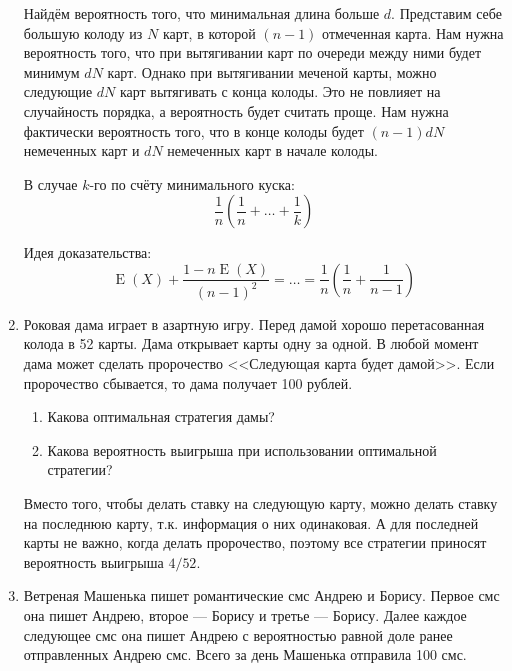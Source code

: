 \documentclass[nobib]{tufte-handout}
\DeclareMathOperator{\E}{E}
\begin{document}
\begin{enumerate}
\begin{solution}
Найдём вероятность того, что минимальная длина больше $d$. Представим себе большую колоду из $N$ карт, в которой $(n-1)$ отмеченная карта. Нам нужна вероятность того, что при вытягивании карт по очереди между ними будет минимум $dN$ карт. Однако при вытягивании меченой карты, можно следующие $dN$ карт вытягивать с конца колоды. Это не повлияет на случайность порядка, а вероятность будет считать проще. Нам нужна фактически вероятность того, что в конце колоды будет $(n-1)dN$ немеченных карт и $dN$ немеченных карт в начале колоды.


В случае $k$-го по счёту минимального куска:
\[
\frac{1}{n}\left( \frac{1}{n} + \ldots + \frac{1}{k}\right)
\]

Идея доказательства:
\[
\E(X) + \frac{1-n\E(X)}{(n-1)^2}=\ldots=\frac{1}{n}\left( \frac{1}{n} + \frac{1}{n-1}\right)
\]
\end{solution}


\item  Роковая дама играет в азартную игру. Перед дамой хорошо перетасованная колода в 52 карты. Дама открывает карты одну за одной. В любой момент дама может сделать пророчество <<Следующая карта будет дамой>>. Если пророчество сбывается, то дама получает 100 рублей. 

\begin{enumerate}
\item Какова оптимальная стратегия дамы?
\item Какова вероятность выигрыша при использовании оптимальной стратегии?
\end{enumerate}

\begin{solution}
Вместо того, чтобы делать ставку на следующую карту, можно делать ставку на последнюю карту, т.к. информация о них одинаковая. А для последней карты не важно, когда делать пророчество, поэтому все стратегии приносят вероятность выигрыша $4/52$.
\end{solution}

\item Ветреная Машенька пишет романтические смс Андрею и Борису. Первое смс она пишет Андрею, второе --- Борису и третье --- Борису. Далее каждое следующее смс она пишет Андрею с вероятностью равной доле ранее отправленных Андрею смс. Всего за день Машенька отправила 100 смс.


\end{enumerate}
\end{document}
